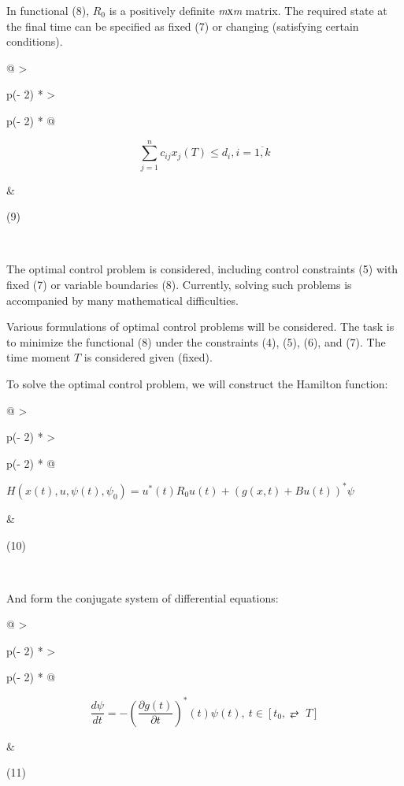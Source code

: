 In functional (8), \(R_{0}\) is a positively definite \emph{m}х\emph{m}
matrix. The required state at the final time can be specified as fixed
(7) or changing (satisfying certain conditions).

\begin{longtable}[]{@{}
  >{\raggedright\arraybackslash}p{(\columnwidth - 2\tabcolsep) * }
  >{\raggedright\arraybackslash}p{(\columnwidth - 2\tabcolsep) * }@{}}
\begin{minipage}[b]{\linewidth}\raggedright
\[\sum_{j = 1}^{n}c_{ij}x_{j}(T) \leq d_{i},i = \overline{1,k}\]
\end{minipage} & \begin{minipage}[b]{\linewidth}\raggedright
(9)
\end{minipage} \\
\end{longtable}

The optimal control problem is considered, including control constraints
(5) with fixed (7) or variable boundaries (8). Currently, solving such
problems is accompanied by many mathematical difficulties. 

Various formulations of optimal control problems will be considered. The task is
to minimize the functional (8) under the constraints (4), (5), (6), and
(7). The time moment \(T\) is considered given (fixed).

To solve the optimal control problem, we will construct the Hamilton
function:

\begin{longtable}[]{@{}
  >{\raggedright\arraybackslash}p{(\columnwidth - 2\tabcolsep) * }
  >{\raggedright\arraybackslash}p{(\columnwidth - 2\tabcolsep) * }@{}}
\begin{minipage}[b]{\linewidth}\raggedright
\(H\left( x(t),u,\psi(t),\psi_{0} \right) = u^{*}(t)R_{0}u(t) + (g(x,t) + Bu(t))^{*}\psi_{}\)
\end{minipage} & \begin{minipage}[b]{\linewidth}\raggedright
(10)
\end{minipage} \\
\end{longtable}

And form the conjugate system of differential equations:

\begin{longtable}[]{@{}
  >{\raggedright\arraybackslash}p{(\columnwidth - 2\tabcolsep) * }
  >{\raggedright\arraybackslash}p{(\columnwidth - 2\tabcolsep) * }@{}}
\begin{minipage}[b]{\linewidth}\raggedright
\[\frac{d\psi}{dt} = - (\frac{\partial g(t)}{\partial t})^{*}(t)\psi(t),\ t \in \left\lbrack t_{0}, ⥂ \mspace{6mu} T \right\rbrack\]
\end{minipage} & \begin{minipage}[b]{\linewidth}\raggedright
(11)
\end{minipage} \\
\end{longtable}

